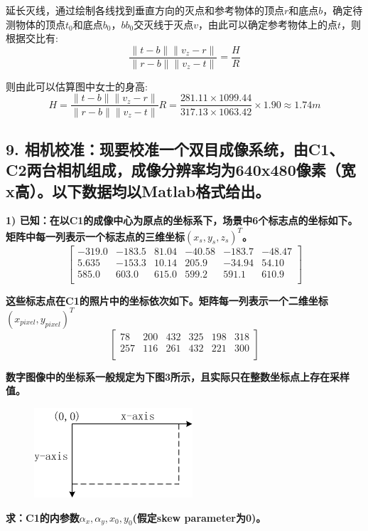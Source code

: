 \documentclass[]{article}
\begin{document}
延长灭线，通过绘制各线找到垂直方向的灭点和参考物体的顶点\(r\)和底点\(b\)，确定待测物体的顶点\(t_0\)和底点\(b_0\)，\(bb_0\)交灭线于灭点\(v\)，由此可以确定参考物体上的点\(t\)，则根据交比有:
$$
\frac{\lVert t-b\rVert \lVert v_z-r\rVert}{\lVert r-b\rVert\lVert v_z-t\rVert}=\frac{H}{R}
$$

则由此可以估算图中女士的身高:
$$
H=\frac{\lVert t-b\rVert \lVert v_z-r\rVert}{\lVert r-b\rVert\lVert v_z-t\rVert}R=\frac{281.11\times 1099.44}{317.13\times 1063.42}\times 1.90\approx 1.74m
$$

\hypertarget{header-n9}{%
\subsection{9. 相机校准：现要校准一个双目成像系统，由C1、C2两台相机组成，成像分辨率均为640x480像素（宽x高）。以下数据均以Matlab格式给出。}\label{header-n9}}

\textbf{1) 已知：在以C1的成像中心为原点的坐标系下，场景中6个标志点的坐标如下。矩阵中每一列表示一个标志点的三维坐标$(x_s,y_s,z_s)^T$。}
$$
\begin{bmatrix} -319.0 & -183.5 & 81.04 & -40.58 & -183.7 & -48.47 \\
   5.635 & -153.3  & 10.14 &  205.9 & -34.94 &  54.10\\
   585.0 &  603.0 &  615.0 &  599.2 & 591.1  &  610.9\\
\end{bmatrix}
$$

\textbf{这些标志点在C1的照片中的坐标依次如下。矩阵每一列表示一个二维坐标$(x_{pixel},y_{pixel})^T$}
$$
\begin{bmatrix} 78 &  200 &  432 &  325  & 198 &  318\\
257 &  116  & 261  & 432  & 221 &  300\\
\end{bmatrix}
$$

\textbf{数字图像中的坐标系一般规定为下图3所示，且实际只在整数坐标点上存在采样值。}

\begin{figure}
\centerline{\includegraphics[width=.3\linewidth]{figures/q9.png}}
\caption{}
\end{figure}

\textbf{求：C1的内参数$α_x,α_y,x_0,y_0$(假定skew parameter为0)。}
\end{document}
